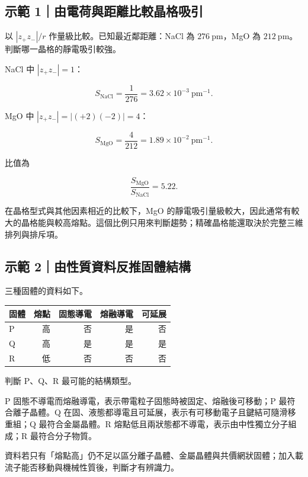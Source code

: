 \documentclass[11pt,a4paper]{article}
\newcounter{none}
\begin{document}
\begin{HandoutWorkedExample}

\subsection{示範 1｜由電荷與距離比較晶格吸引}\label{ux793aux7bc4-1ux7531ux96fbux8377ux8207ux8dddux96e2ux6bd4ux8f03ux6676ux683cux5438ux5f15}

以 \(|z_+z_-|/r\) 作量級比較。已知最近鄰距離：NaCl 為 \(276\ \mathrm{pm}\)，MgO 為 \(212\ \mathrm{pm}\)。判斷哪一晶格的靜電吸引較強。

NaCl 中 \(|z_+z_-|=1\)：

\[
S_{\mathrm{NaCl}}=\frac{1}{276}=3.62\times10^{-3}\ \mathrm{pm^{-1}}.
\]

MgO 中 \(|z_+z_-|=|(+2)(-2)|=4\)：

\[
S_{\mathrm{MgO}}=\frac{4}{212}=1.89\times10^{-2}\ \mathrm{pm^{-1}}.
\]

比值為

\[
\frac{S_{\mathrm{MgO}}}{S_{\mathrm{NaCl}}}=5.22.
\]

在晶格型式與其他因素相近的比較下，MgO 的靜電吸引量級較大，因此通常有較大的晶格能與較高熔點。這個比例只用來判斷趨勢；精確晶格能還取決於完整三維排列與排斥項。

\end{HandoutWorkedExample}

\begin{HandoutWorkedExample}

\subsection{示範 2｜由性質資料反推固體結構}\label{ux793aux7bc4-2ux7531ux6027ux8ceaux8cc7ux6599ux53cdux63a8ux56faux9ad4ux7d50ux69cb}

三種固體的資料如下。

{\def\LTcaptype{none} %
\begin{longtable}[]{@{}lrrrr@{}}
\toprule\noalign{}
固體 & 熔點 & 固態導電 & 熔融導電 & 可延展 \\
\midrule\noalign{}
\endhead
\bottomrule\noalign{}
\endlastfoot
P & 高 & 否 & 是 & 否 \\
Q & 高 & 是 & 是 & 是 \\
R & 低 & 否 & 否 & 否 \\
\end{longtable}
}

判斷 P、Q、R 最可能的結構類型。

P 固態不導電而熔融導電，表示帶電粒子固態時被固定、熔融後可移動；P 最符合離子晶體。Q 在固、液態都導電且可延展，表示有可移動電子且鍵結可隨滑移重組；Q 最符合金屬晶體。R 熔點低且兩狀態都不導電，表示由中性獨立分子組成；R 最符合分子物質。

資料若只有「熔點高」仍不足以區分離子晶體、金屬晶體與共價網狀固體；加入載流子能否移動與機械性質後，判斷才有辨識力。

\end{HandoutWorkedExample}
\end{document}
